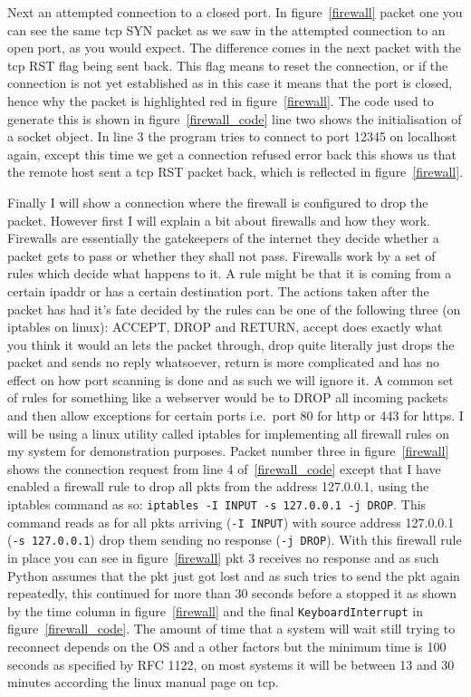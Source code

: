 \documentclass[titlepage]{article}
\begin{document}
Next an attempted connection to a closed port. In figure~\ref{firewall} packet one you can see
the same \gls{tcp} SYN packet as we saw in the attempted connection to an open port, as you
would expect. The difference comes in the next packet with the \gls{tcp} RST flag being sent
back. This flag means to reset the connection, or if the connection is not yet established
as in this case it means that the port is closed, hence why the packet is highlighted red
in figure~\ref{firewall}. The code used to generate this is shown in figure~\ref{firewall_code}
line two shows the initialisation of a socket object. In line 3 the program tries to connect
to port 12345 on localhost again, except this time we get a connection refused error back
this shows us that the remote host sent a \gls{tcp} RST packet back, which is reflected in
figure~\ref{firewall}.

Finally I will show a connection where the firewall is configured to drop the packet. However first 
I will explain a bit about firewalls and how they work. Firewalls are essentially the gatekeepers of 
the internet they decide whether a packet gets to pass or whether they shall not pass. Firewalls 
work by a set of rules which decide what happens to it. A rule might be that it is coming from a 
certain \gls{ipaddr} or has a certain destination port. The actions taken after the packet has had 
it's fate decided by the rules can be one of the following three (on iptables on linux): ACCEPT, 
DROP and RETURN, accept does exactly what you think it would an lets the packet through, drop quite 
literally just drops the packet and sends no reply whatsoever, return is more complicated and has no 
effect on how port scanning is done and as such we will ignore it. A common set of rules for 
something like a webserver would be to DROP all incoming packets and then allow exceptions for 
certain ports i.e.\ port 80 for \gls{http} or 443 for \gls{https}. I will be using a linux utility 
called iptables for implementing all firewall rules on my system for demonstration purposes. Packet 
number three in figure~\ref{firewall} shows the connection request from line 4 
of~\ref{firewall_code} except that I have enabled a firewall rule to drop all \glspl{pkt} from the 
address 127.0.0.1, using the iptables command as so: \verb$iptables -I INPUT -s 127.0.0.1 -j DROP$. 
This command reads as for all \glspl{pkt} arriving (\verb|-I INPUT|) with source address 127.0.0.1 
(\verb|-s 127.0.0.1|) drop them sending no response (\verb|-j DROP|). With this firewall rule in 
place you can see in figure~\ref{firewall} \gls{pkt} 3 receives no response and as such Python 
assumes that the \gls{pkt} just got lost and as such tries to send the \gls{pkt} again repeatedly, 
this continued for more than 30 seconds before a stopped it as shown by the time column in 
figure~\ref{firewall} and the final \verb|KeyboardInterrupt| in figure~\ref{firewall_code}. The 
amount of time that a system will wait still trying to reconnect depends on the OS and a other 
factors but the minimum time is 100 seconds as specified by RFC 1122, on most systems it will be 
between 13 and 30 minutes according the linux manual page on \gls{tcp}.
\end{document}
